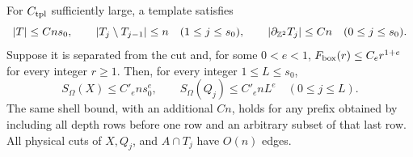\begin{lemma}
\label{scanner:templates}
For \(C_{\rm tpl}\) sufficiently large, a template satisfies
\begin{equation}
 |T|\le Cns_0,\qquad
 |T_j\setminus T_{j-1}|\le n\quad(1\le j\le s_0),
 \qquad |\partial_{\mathbb Z^2}T_j|\le Cn\quad(0\le j\le s_0).
 \label{scanner:template-geometry}
\end{equation}
Suppose it is separated from the cut and, for some \(0<e<1\),
\(F_{\rm box}(r)\le C_e r^{1+e}\) for every integer \(r\ge1\).
Then, for every integer \(1\le L\le s_0\),
\begin{equation}
 S_\Omega(X)\le C'_e ns_0^e,\qquad
 S_\Omega(Q_j)\le C'_e nL^e\quad(0\le j\le L).
 \label{scanner:template-entropy}
\end{equation}
The same shell bound, with an additional \(Cn\), holds for any prefix
obtained by including all depth rows before one row and an arbitrary
subset of that last row.  All physical cuts of \(X,Q_j\), and
\(A\cap T_j\) have \(O(n)\) edges.
\end{lemma}

